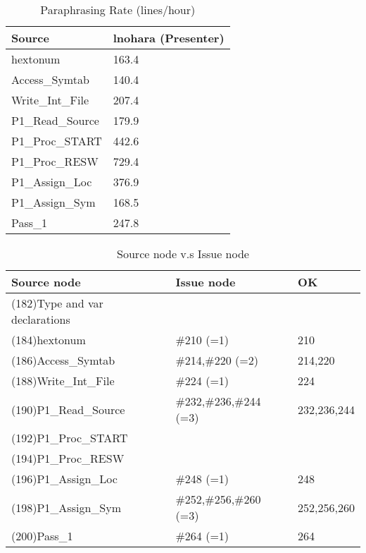 \begin{table}[hb]
\begin{center}
\begin{tabular}{|l|l|}
\hline
Source & lnohara (Presenter)\\
\hline
hextonum & 163.4\\
Access\_Symtab & 140.4\\
Write\_Int\_File & 207.4\\
P1\_Read\_Source & 179.9\\
P1\_Proc\_START & 442.6\\
P1\_Proc\_RESW & 729.4\\
P1\_Assign\_Loc & 376.9\\
P1\_Assign\_Sym & 168.5\\
Pass\_1 & 247.8\\
\hline
\end{tabular}
\end{center}
\caption{Paraphrasing Rate (lines/hour)}
\end{table}


\begin{table}[hb]
\begin{center}
\begin{tabular}{|l|l|l|}
\hline
Source node & Issue node  & OK\\
\hline
(182)Type and var declarations &  & \\
(184)hextonum & \#210 (=1) & 210\\
(186)Access\_Symtab & \#214,\#220 (=2) & 214,220 \\
(188)Write\_Int\_File & \#224 (=1) & 224\\
(190)P1\_Read\_Source & \#232,\#236,\#244 (=3) & 232,236,244\\
(192)P1\_Proc\_START &  & \\
(194)P1\_Proc\_RESW &  & \\
(196)P1\_Assign\_Loc & \#248 (=1) & 248\\
(198)P1\_Assign\_Sym & \#252,\#256,\#260 (=3) & 252,256,260 \\
(200)Pass\_1 & \#264 (=1) & 264\\
\hline
\end{tabular}
\caption{Source node v.s Issue node}
\end{center}
\end{table}

